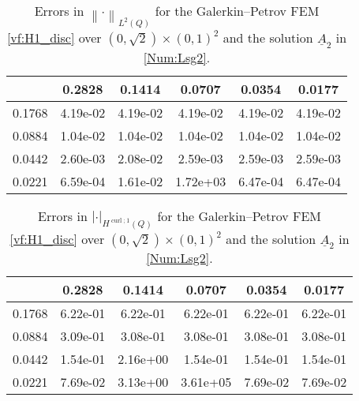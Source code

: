 \documentclass[a4paper,11pt]{article}
\newcommand{\cu}{\operatorname{curl}}
\renewcommand{\vec}[1]{\underline{#1}}
\newcommand{\abs}[1]{\left\lvert{#1}\right\rvert}
\newcommand{\norm}[1]{{\left\lVert{#1}\right\rVert}}
\begin{document}
\begin{table}[h]
\begin{center}
	\caption{Errors in $\norm{\cdot}_{L^2(Q)}$ for the Galerkin--Petrov FEM  \eqref{vf:H1_disc} over $(0,\sqrt{2})\times(0,1)^2$ and the solution $\vec A_2$ in \eqref{Num:Lsg2}.}
	\begin{tabular}{c|ccccc}
			\diagbox{$h_x$}{\vspace*{-.1cm}$h_t$}&    0.2828 & 0.1414 &0.0707 &  0.0354 & 0.0177 \\
			\hline\hline
		0.1768 & 4.19e-02 & 4.19e-02 & 4.19e-02 & 4.19e-02 & 4.19e-02 \\
		0.0884 & 1.04e-02 & 1.04e-02 & 1.04e-02 & 1.04e-02 & 1.04e-02 \\
		0.0442 & 2.60e-03 & 2.08e-02 & 2.59e-03 & 2.59e-03 & 2.59e-03 \\
		0.0221 & 6.59e-04 & 1.61e-02 & 1.72e+03 & 6.47e-04 & 6.47e-04 \\
	\end{tabular}
	\label{Num:TabT2L2}
\end{center}
\end{table}


\begin{table}[h]
	\begin{center}
	\caption{Errors in $\abs{\cdot}_{H^{\cu;1}(Q)}$ for the Galerkin--Petrov FEM  \eqref{vf:H1_disc} over $(0,\sqrt{2})\times(0,1)^2$ and the solution $\vec A_2$ in \eqref{Num:Lsg2}.}
	\begin{tabular}{c|ccccc}
		\diagbox{$h_x$}{\vspace*{-.1cm}$h_t$}&   0.2828 &  0.1414 & 0.0707 & 0.0354 & 0.0177 \\
		\hline\hline		
		0.1768 & 6.22e-01 & 6.22e-01 & 6.22e-01 & 6.22e-01 & 6.22e-01 \\
		0.0884 & 3.09e-01 & 3.08e-01 & 3.08e-01 & 3.08e-01 & 3.08e-01 \\
		0.0442 & 1.54e-01 & 2.16e+00 & 1.54e-01 & 1.54e-01 & 1.54e-01 \\
		0.0221 & 7.69e-02 & 3.13e+00 & 3.61e+05 & 7.69e-02 & 7.69e-02 \\
	\end{tabular}
	\label{Num:TabT2HC1}
\end{center}
\end{table}
\end{document}
